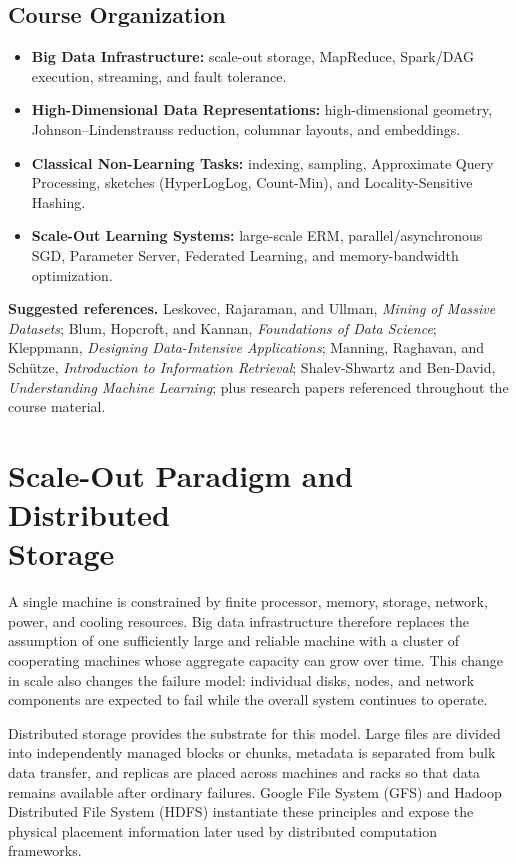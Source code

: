 \documentclass[11pt,a4paper,oneside]{book}
\begin{document}
\section*{Course Organization}
{\small
\begin{itemize}[leftmargin=1.4em,itemsep=0.08em,topsep=0.18em]
  \item \textbf{Big Data Infrastructure:} scale-out storage, MapReduce, Spark/DAG execution, streaming, and fault tolerance.
  \item \textbf{High-Dimensional Data Representations:} high-dimensional geometry, Johnson--Lindenstrauss reduction, columnar layouts, and embeddings.
  \item \textbf{Classical Non-Learning Tasks:} indexing, sampling, Approximate Query Processing, sketches (HyperLogLog, Count-Min), and Locality-Sensitive Hashing.
  \item \textbf{Scale-Out Learning Systems:} large-scale ERM, parallel/asynchronous SGD, Parameter Server, Federated Learning, and memory-bandwidth optimization.
\end{itemize}

\textbf{Suggested references.} Leskovec, Rajaraman, and Ullman, \emph{Mining of Massive Datasets}; Blum, Hopcroft, and Kannan, \emph{Foundations of Data Science}; Kleppmann, \emph{Designing Data-Intensive Applications}; Manning, Raghavan, and Schütze, \emph{Introduction to Information Retrieval}; Shalev-Shwartz and Ben-David, \emph{Understanding Machine Learning}; plus research papers referenced throughout the course material.
}

\clearpage
\mainmatter

\chapter[Scale-Out Paradigm and Distributed Storage]{Scale-Out Paradigm and Distributed\\Storage}
\label{chap:scale-out-storage}

A single machine is constrained by finite processor, memory, storage, network, power, and cooling resources. Big data infrastructure therefore replaces the assumption of one sufficiently large and reliable machine with a cluster of cooperating machines whose aggregate capacity can grow over time. This change in scale also changes the failure model: individual disks, nodes, and network components are expected to fail while the overall system continues to operate.

Distributed storage provides the substrate for this model. Large files are divided into independently managed blocks or chunks, metadata is separated from bulk data transfer, and replicas are placed across machines and racks so that data remains available after ordinary failures. Google File System (GFS) and Hadoop Distributed File System (HDFS) instantiate these principles and expose the physical placement information later used by distributed computation frameworks.
\end{document}
